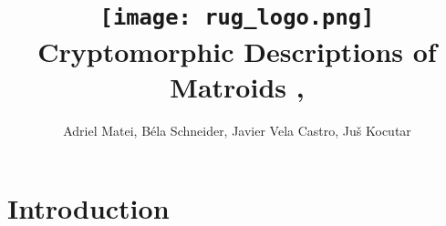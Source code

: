 \documentclass{article}
\title{ {\texttt{[image: rug\_logo.png]}}\\
    \vspace{2cm}
    {Cryptomorphic Descriptions of Matroids} ,
    }
\author{Adriel Matei, Béla Schneider, Javier Vela Castro, Juš Kocutar}
\theoremstyle{plain}
\theoremstyle{definition}
\theoremstyle{remark}
\numberwithin{equation}{section}
\begin{document}
\maketitle


\newpage

\tableofcontents

\newpage
\section{Introduction}

















\appendix




\nocite{*} 


\end{document}

